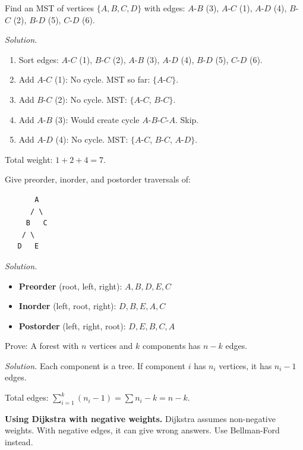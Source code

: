 \begin{example}
Find an MST of vertices $\{A, B, C, D\}$ with edges: $A$-$B$ (3), $A$-$C$ (1), $A$-$D$ (4), $B$-$C$ (2), $B$-$D$ (5), $C$-$D$ (6).

\emph{Solution.}
\begin{enumerate}
  \item Sort edges: $A$-$C$ (1), $B$-$C$ (2), $A$-$B$ (3), $A$-$D$ (4), $B$-$D$ (5), $C$-$D$ (6).
  \item Add $A$-$C$ (1): No cycle. MST so far: $\{A$-$C\}$.
  \item Add $B$-$C$ (2): No cycle. MST: $\{A$-$C$, $B$-$C\}$.
  \item Add $A$-$B$ (3): Would create cycle $A$-$B$-$C$-$A$. Skip.
  \item Add $A$-$D$ (4): No cycle. MST: $\{A$-$C$, $B$-$C$, $A$-$D\}$.
\end{enumerate}
Total weight: $1 + 2 + 4 = 7$.
\end{example}

\begin{example}
Give preorder, inorder, and postorder traversals of:
\begin{verbatim}
       A
      / \
     B   C
    / \
   D   E
\end{verbatim}

\emph{Solution.}
\begin{itemize}
  \item \textbf{Preorder} (root, left, right): $A, B, D, E, C$
  \item \textbf{Inorder} (left, root, right): $D, B, E, A, C$
  \item \textbf{Postorder} (left, right, root): $D, E, B, C, A$
\end{itemize}
\end{example}

\begin{example}
Prove: A forest with $n$ vertices and $k$ components has $n - k$ edges.

\emph{Solution.} Each component is a tree. If component $i$ has $n_i$ vertices, it has $n_i - 1$ edges.

Total edges: $\sum_{i=1}^k (n_i - 1) = \sum n_i - k = n - k$.
\end{example}

\begin{commonmistake}
\textbf{Using Dijkstra with negative weights.} Dijkstra assumes non-negative weights. With negative edges, it can give wrong answers. Use Bellman-Ford instead.
\end{commonmistake}

